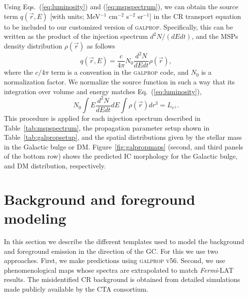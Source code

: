 \documentclass[doublespace,draft,nopageskip]{VTthesis} %
\begin{document}
Using Eqs.~(\ref{eq:luminosity}) and (\ref{eq:mspspectrum}), we can obtain the source term $q(\vec{r},E)$ [with units; MeV$^{-1}$ cm$^{-2}$ s$^{-2}$ sr$^{-1}$] in the CR transport equation to be included to our customized version of \textsc{galprop}. Specifically, this can be written as the product of the injection spectrum $d^2N/(dEdt)$, and the MSPs density distribution $\rho(\vec{r})$ as follows 
\begin{equation}\label{eq:sourcefunction}
  q(\vec{r},E) = \frac{c}{4\pi} N_0 \dfrac{d^2N}{dEdt}\rho(\vec{r}),
\end{equation}
where the $c/4\pi$ term is a convention in the \textsc{galprop} code, and $N_0$ is a normalization factor. We normalize the source function in such a way that its integration over volume and energy matches Eq.~(\ref{eq:luminosity}),
\begin{equation}
  \label{eq:norm}
  N_0 \int E\dfrac{d^2N}{dEdt}dE \int\rho(\vec{r})dr^3 = L_{e^\pm}. 
\end{equation}
This procedure is applied for each injection spectrum described in Table~\ref{tab:mspspectrum}, the propagation parameter setup shown in Table~\ref{tab:galpropsetup}, and the spatial distributions given by the stellar mass in the Galactic bulge or DM. Figure~\ref{fig:galpropmaps} (second, and third panels of the bottom row) shows  the predicted IC morphology for the Galactic bulge, and DM distribution, respectively.   


\section{Background and foreground modeling}
\label{sec:backgroundtemplates}
In this section we describe the different templates used to model the background and foreground emission in the direction of the GC. For this we use two approaches. First, we make predictions using \textsc{galprop v56}. Second, we use phenomenological maps whose spectra are extrapolated to match \textit{Fermi}-LAT results. The misidentified CR background is obtained from detailed simulations made publicly available by the CTA consortium.
\end{document}
